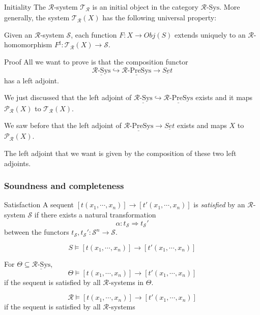 \documentclass{beamer}
\begin{document}
\begin{frame}
    \scriptsize
    \begin{block}{Initiality}
        The $\mathcal{R}$-system $\mathcal{T_R}$ is an initial object in the category 
        $\underline{\mathcal{R}\text{-Sys}}$. More generally, the system $\mathcal{T_R}(X)$ has the following universal property:

        \medskip
        Given an $\mathcal{R}$-system $\mathcal{S}$, each function $F:X \rightarrow Obj(S)$ extends uniquely 
        to an $\mathcal{R}$-homomorphism $F^\sharp: \mathcal{T_R}(X) \rightarrow \mathcal{S}$.
    \end{block}
    \pause
    \begin{block}{Proof}
        All we want to prove is that the composition functor 
        $$ \underline{\mathcal{R}\text{-Sys}} \hookrightarrow \underline{\mathcal{R}\text{-PreSys}} \rightarrow \underline{Set}$$
        has a left adjoint. 

        \pause
        We just discussed that the left adjoint of $ \underline{\mathcal{R}\text{-Sys}} \hookrightarrow \underline{\mathcal{R}\text{-PreSys}}$ exists and it maps 
        $\mathcal{P_R}(X)$ to $\mathcal{T_R}(X)$.
        
        \pause
        We saw before that the left adjoint of $\underline{\mathcal{R}\text{-PreSys}} \rightarrow \underline{Set}$ exists and maps $X$ to $\mathcal{P_R}(X)$.
        
        \pause
        The left adjoint that we want is given by the composition of these two left adjoints.
    \end{block}
\end{frame}
\begin{frame}
    \frametitle{Soundness and completeness}
    \scriptsize
    \begin{block}{Satisfaction}
        A sequent $[t(x_1,\cdots,x_n)] \rightarrow [t'(x_1,\cdots,x_n)]$ is \emph{satisfied} by 
        an $\mathcal{R}$-system $\mathcal{S}$ if there exists a natural transformation
        $$ \alpha: t_\mathcal{S} \Rightarrow t_\mathcal{S}'$$ 
        between the functors $t_\mathcal{S},t_\mathcal{S}':\mathcal{S}^n \rightarrow \mathcal{S}.$

        $$ S \models [t(x_1,\cdots,x_n)] \rightarrow [t'(x_1,\cdots,x_n)]$$
    \end{block}
\pause

For $\Theta \subseteq \underline{\mathcal{R}\text{-Sys}}$,
$$ \Theta \models [t(x_1,\cdots,x_n)] \rightarrow [t'(x_1,\cdots,x_n)]$$
if the sequent is satisfied by all $\mathcal{R}$-systems in $\Theta$.

\pause 
$$ \mathcal{R} \models [t(x_1,\cdots,x_n)] \rightarrow [t'(x_1,\cdots,x_n)]$$
if the sequent is satisfied by all $\mathcal{R}$-systems
\end{frame}
\end{document}
